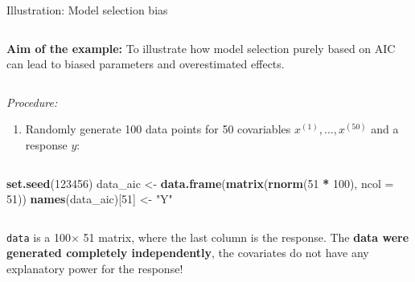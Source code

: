 \documentclass[10pt,ignorenonframetext,]{beamer}
\newenvironment{Shaded}{\begin{snugshade}}{\end{snugshade}}
\newcommand{\DataTypeTok}[1]{\textcolor[rgb]{0.13,0.29,0.53}{#1}}
\newcommand{\DecValTok}[1]{\textcolor[rgb]{0.00,0.00,0.81}{#1}}
\newcommand{\KeywordTok}[1]{\textcolor[rgb]{0.13,0.29,0.53}{\textbf{#1}}}
\newcommand{\NormalTok}[1]{#1}
\newcommand{\OperatorTok}[1]{\textcolor[rgb]{0.81,0.36,0.00}{\textbf{#1}}}
\newcommand{\StringTok}[1]{\textcolor[rgb]{0.31,0.60,0.02}{#1}}
\providecommand{\tightlist}{%
  \setlength{\itemsep}{0pt}\setlength{\parskip}{0pt}}
\begin{document}
\begin{frame}[fragile]

\begin{block}{Illustration: Model selection bias}

\(~\)

\textbf{Aim of the example:} To illustrate how model selection purely
based on AIC can lead to biased parameters and overestimated effects.

\(~\)

\emph{Procedure:} \vspace{2mm}

\begin{enumerate}
\tightlist
\item
  Randomly generate 100 data points for 50 covariables
  \(x^{(1)},\ldots, x^{(50)}\) and a response \(y\):
\end{enumerate}

\(~\) \scriptsize

\begin{Shaded}
\begin{Highlighting}[]
\KeywordTok{set.seed}\NormalTok{(}\DecValTok{123456}\NormalTok{)}
\NormalTok{data_aic <-}\StringTok{ }\KeywordTok{data.frame}\NormalTok{(}\KeywordTok{matrix}\NormalTok{(}\KeywordTok{rnorm}\NormalTok{(}\DecValTok{51} \OperatorTok{*}\StringTok{ }\DecValTok{100}\NormalTok{), }\DataTypeTok{ncol =} \DecValTok{51}\NormalTok{))}
\KeywordTok{names}\NormalTok{(data_aic)[}\DecValTok{51}\NormalTok{] <-}\StringTok{ "Y"}
\end{Highlighting}
\end{Shaded}

\(~\)

\normalsize

\texttt{data} is a 100\(\times\) 51 matrix, where the last column is the
response. The \textbf{data were generated completely independently}, the
covariates do not have any explanatory power for the response!

\end{block}

\end{frame}
\end{document}
